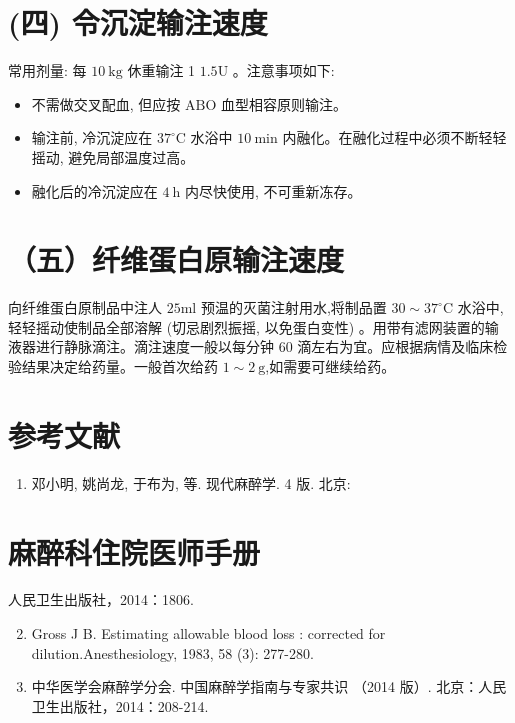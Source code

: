 \documentclass[10pt]{article}
\begin{document}
\section*{(四) 令沉淀输注速度}
常用剂量: 每 $10 \mathrm{~kg}$ 休重输注 1 $1.5 \mathrm{U}$ 。注意事项如下:

\begin{itemize}
  \item 不需做交叉配血, 但应按 $\mathrm{ABO}$ 血型相容原则输注。
  \item 输注前, 冷沉淀应在 $37^{\circ} \mathrm{C}$ 水浴中 $10 \mathrm{~min}$ 内融化。在融化过程中必须不断轻轻摇动, 避免局部温度过高。
  \item 融化后的冷沉淀应在 $4 \mathrm{~h}$ 内尽快使用, 不可重新冻存。
\end{itemize}

\section*{（五）纤维蛋白原输注速度}
向纤维蛋白原制品中注人 $25 \mathrm{ml}$ 预温的灭菌注射用水,将制品置 $30 \sim 37^{\circ} \mathrm{C}$ 水浴中, 轻轻摇动使制品全部溶解 (切忌剧烈振摇, 以免蛋白变性) 。用带有滤网装置的输液器进行静脉滴注。滴注速度一般以每分钟 60 滴左右为宜。应根据病情及临床检验结果决定给药量。一般首次给药 $1 \sim 2 \mathrm{~g}$,如需要可继续给药。

\section*{参考文献}
\begin{enumerate}
  \item 邓小明, 姚尚龙, 于布为, 等. 现代麻醉学. 4 版. 北京:
\end{enumerate}

\section*{麻醉科住院医师手册}
人民卫生出版社，2014：1806.

\begin{enumerate}
  \setcounter{enumi}{1}
  \item Gross J B. Estimating allowable blood loss : corrected for dilution.Anesthesiology, 1983, 58 (3): 277-280.

  \item 中华医学会麻醉学分会. 中国麻醉学指南与专家共识 （2014 版）. 北京：人民卫生出版社，2014：208-214.

\end{enumerate}
\end{document}
